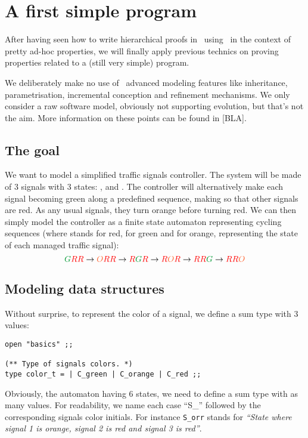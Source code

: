 
\section{A first simple program}
After having seen how to write hierarchical proofs in \focal\ using
\zenon\ in the context of pretty ad-hoc properties, we will finally
apply previous technics on proving properties related to a (still very
simple) program.

We deliberately make no use of \focal\ advanced modeling features like
in\-he\-ri\-tan\-ce, parametrisation, incremental conception and refinement
mechanisms. We only consider a raw software model, obviously not
supporting evolution, but that's not the aim. More information on
these points can be found in [BLA].

\subsection{The goal}
We want to model a simplified traffic signals controller. The system will
be made of 3 signals with 3 states: ,  and
. The controller will alternatively make each signal becoming
green along a predefined sequence, making so that other signals are
red. As any usual signals, they turn orange before turning red. We can
then simply model the controller as a finite state automaton representing
cycling sequences (where  stands for red,  for green
and  for orange, representing the state of each managed traffic
signal):
$$\green{G}\red{R}\red{R} \rightarrow \orange{O}\red{R}\red{R}
\rightarrow \red{R}\green{G}\red{R} \rightarrow \red{R}\orange{O}\red{R}
\rightarrow \red{R}\red{R}\green{G} \rightarrow \red{R}\red{R}\orange{O}$$


\subsection{Modeling data structures}
Without surprise, to represent the color of a signal, we define a sum
type with 3 values:

{\scriptsize
\begin{lstlisting}
open "basics" ;;

(** Type of signals colors. *)
type color_t = | C_green | C_orange | C_red ;;
\end{lstlisting}}

Obviously, the automaton having 6 states, we need to define a sum type
with as many values. For readability, we name each case ``S\_''
followed by the corresponding signals color initials. For instance
\lstinline"S_orr" stands for {\em ``State where signal 1 is orange, signal
2 is red and signal 3 is red''}.

